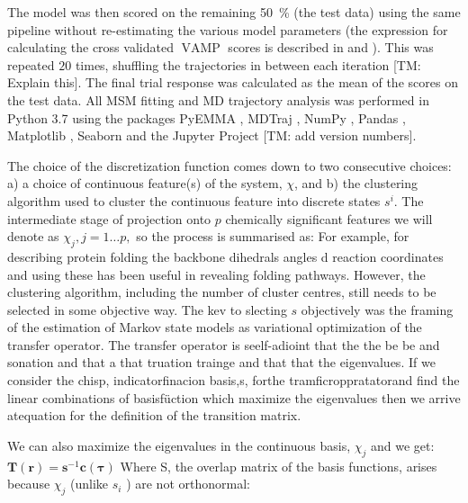 The model was then scored on the remaining \SI{50}{\percent} (the test data) using the same pipeline without re-estimating the various model parameters (the expression for calculating the cross validated $\operatorname{VAMP}$ scores is described in \cite{mcgibbonVariationalCrossvalidationSlow2015} and \cite{wuVariationalApproachLearning2019}). This was repeated $20$ times, shuffling the trajectories in between each iteration [TM: Explain this].  The final trial response was calculated as the mean of the scores on the test data. All MSM fitting and MD trajectory analysis was performed in Python 3.7 using the packages PyEMMA \cite{schererPyEMMASoftwarePackage2015a}, MDTraj \cite{mcgibbonMDTrajModernOpen2015}, NumPy \cite{waltNumPyArrayStructure2011}, Pandas \cite{mckinneyPandasFoundationalPython2011}, Matplotlib \cite{hunterMatplotlib2DGraphics2007},  Seaborn \cite{michaelwaskomMwaskomSeabornV02020} and the Jupyter Project \cite{kluyverJupyterNotebooksPublishing2016} [TM: add version numbers].








The choice of the discretization function comes down to two consecutive choices: a) a choice of continuous feature(s) of the system, $\chi$, and b) the clustering algorithm used to cluster the continuous feature into discrete states $s^{i}$. The intermediate stage of projection onto $p$ chemically significant features we will denote as $\chi_{j}, j=1 \ldots p,$ so the process is summarised as:
For example, for describing protein folding the backbone dihedrals angles d reaction coordinates and using these has been useful in revealing folding pathways. However, the clustering algorithm, including the number of cluster centres, still needs to be selected in some objective way. The kev to slecting $s$ objectively was the framing of the estimation of Markov state models as variational optimization of the transfer operator. The transfer operator is seelf-adioint that the the be be and sonation and that a that truation trainge and that that the eigenvalues. If we consider the chisp, indicatorfinacion basis,s, forthe tramficroppratatorand find the linear combinations of basisfüction which maximize the eigenvalues then we arrive atequation for the definition of the transition matrix.

We can also maximize the eigenvalues in the continuous basis, $\chi_{j}$ and we get:
$\mathbf{T}(\mathbf{r})=\mathbf{s}^{-1} \mathbf{c}(\mathbf{\tau})$
Where S, the overlap matrix of the basis functions, arises because $\chi_{j}$ (unlike $s_{i}$ ) are not orthonormal:

